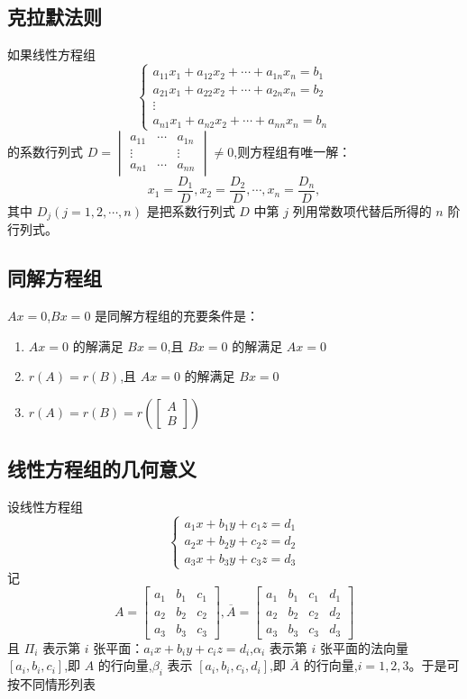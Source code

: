 \documentclass[UTF8]{ctexart}
\theoremstyle{remark}
\begin{document}
	\subsection{克拉默法则}
	如果线性方程组
	\[
	\begin{cases}
		a_{11}x_1 + a_{12}x_2 + \cdots + a_{1n}x_n = b_1 \\
		a_{21}x_1 + a_{22}x_2 + \cdots + a_{2n}x_n = b_2 \\
		\vdots \\
		a_{n1}x_1 + a_{n2}x_2 + \cdots + a_{nn}x_n = b_n
	\end{cases}
	\]
	的系数行列式 \(D = 
	\begin{vmatrix}
		a_{11} & \cdots & a_{1n} \\
		\vdots & & \vdots \\
		a_{n1} & \cdots & a_{nn}
	\end{vmatrix}
	\neq 0\),则方程组有唯一解：
	\[
	x_1 = \frac{D_1}{D}, x_2 = \frac{D_2}{D}, \cdots, x_n = \frac{D_n}{D},
	\]
	其中 \(D_j (j = 1,2,\cdots,n)\) 是把系数行列式 \(D\) 中第 \(j\) 列用常数项代替后所得的 \(n\) 阶行列式。
	
	\subsection{同解方程组}
	\(Ax = 0\),\(Bx = 0\) 是同解方程组的充要条件是：
	\begin{enumerate}
		\item \(Ax = 0\) 的解满足 \(Bx = 0\),且 \(Bx = 0\) 的解满足 \(Ax = 0\)
		\item \(r(A) = r(B)\),且 \(Ax = 0\) 的解满足 \(Bx = 0\)
		\item \(r(A) = r(B) = r\left(\begin{bmatrix}A\\B\end{bmatrix}\right)\)
	\end{enumerate}
	
	\subsection{线性方程组的几何意义}
	设线性方程组
	\[
	\begin{cases}
		a_1x + b_1y + c_1z = d_1 \\
		a_2x + b_2y + c_2z = d_2 \\
		a_3x + b_3y + c_3z = d_3
	\end{cases}
	\]
	记
	\[
	A = 
	\begin{bmatrix}
		a_1 & b_1 & c_1 \\
		a_2 & b_2 & c_2 \\
		a_3 & b_3 & c_3
	\end{bmatrix},
	\overline{A} = 
	\begin{bmatrix}
		a_1 & b_1 & c_1 & d_1 \\
		a_2 & b_2 & c_2 & d_2 \\
		a_3 & b_3 & c_3 & d_3
	\end{bmatrix}
	\]
	且 \(\Pi_i\) 表示第 \(i\) 张平面：\(a_ix + b_iy + c_iz = d_i\),\(\alpha_i\) 表示第 \(i\) 张平面的法向量 \([a_i, b_i, c_i]\),即 \(A\) 的行向量,\(\beta_i\) 表示 \([a_i, b_i, c_i, d_i]\),即 \(\overline{A}\) 的行向量,\(i = 1,2,3\)。于是可按不同情形列表
	
\end{document}
